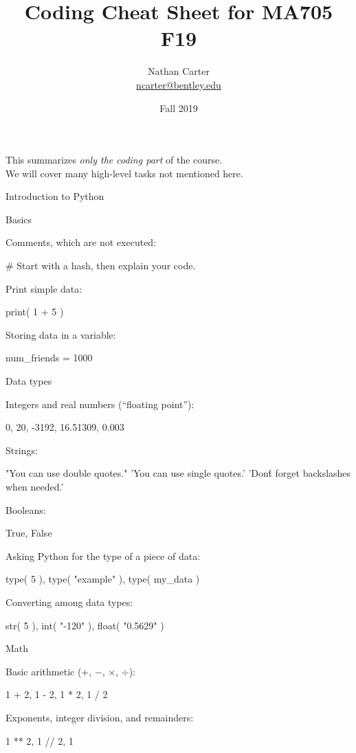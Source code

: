 \documentclass[a4paper,landscape,columns=3]{cheatsheet}
\title{Coding Cheat Sheet for MA705 F19}
\author{Nathan Carter\\\href{mailto:ncarter@bentley.edu}{ncarter@bentley.edu}}
\date{Fall 2019}%
\def\chap#1{\vspace{5mm}\begin{tcolorbox}[colback=red!5!white,colframe=red!75!black,leftrule=3mm]
    \Large #1
\end{tcolorbox}}
\def\sect#1{\begin{tcolorbox}[colback=blue!5!white,colframe=blue!75!black,size=title,leftrule=2mm]
    \large #1
\end{tcolorbox}}
\begin{document}
\maketitle

This summarizes \emph{only the coding part} of the course. \\
We will cover many high-level tasks not mentioned here.

\chap{Introduction to Python}

\sect{Basics}

Comments, which are not executed:
\begin{python}
# Start with a hash, then explain your code.
\end{python}

Print simple data:
\begin{python}
print( 1 + 5 )
\end{python}

Storing data in a variable:
\begin{python}
num_friends = 1000
\end{python}

\sect{Data types}

Integers and real numbers (``floating point''):
\begin{python}
0, 20, -3192, 16.51309, 0.003
\end{python}

Strings:
\begin{python}
"You can use double quotes."
'You can use single quotes.'
'Don\'t forget backslashes when needed.'
\end{python}

Booleans:
\begin{python}
True, False
\end{python}

Asking Python for the type of a piece of data:
\begin{python}
type( 5 ), type( "example" ), type( my_data )
\end{python}

Converting among data types:
\begin{python}
str( 5 ), int( "-120" ), float( "0.5629" )
\end{python}

\sect{Math}

Basic arithmetic ($+$, $-$, $\times$, $\div$):
\begin{python}
1 + 2, 1 - 2, 1 * 2, 1 / 2
\end{python}

Exponents, integer division, and remainders:
\begin{python}
1 ** 2, 1 // 2, 1 %
\end{python}
\end{document}
